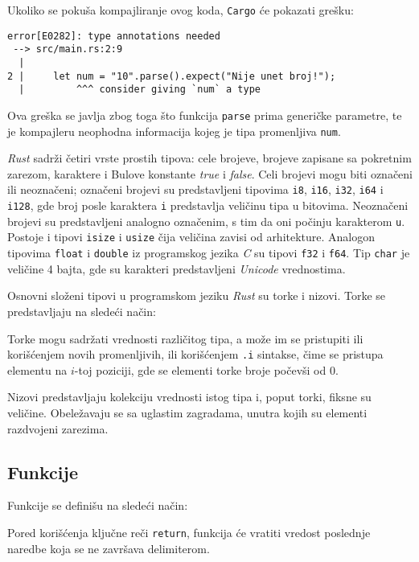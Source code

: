 \documentclass[12pt,oneside]{memoir}
\begin{document}
Ukoliko se pokuša kompajliranje ovog koda, \texttt{Cargo} će
pokazati grešku:

\begin{verbatim}
error[E0282]: type annotations needed
 --> src/main.rs:2:9
  |
2 |     let num = "10".parse().expect("Nije unet broj!");
  |         ^^^ consider giving `num` a type
\end{verbatim}

Ova greška se javlja zbog toga što funkcija \texttt{parse}
prima generičke parametre, te je kompajleru neophodna informacija
kojeg je tipa promenljiva \texttt{num}.

\emph{Rust} sadrži četiri vrste prostih tipova: cele brojeve,
brojeve zapisane sa pokretnim zarezom, karaktere i Bulove
konstante \emph{true} i \emph{false}. Celi brojevi mogu biti
označeni ili neoznačeni; označeni brojevi su predstavljeni
tipovima \texttt{i8}, \texttt{i16}, \texttt{i32}, \texttt{i64} i
\texttt{i128}, gde broj posle karaktera \texttt{i} predstavlja
veličinu tipa u bitovima. Neoznačeni brojevi su predstavljeni
analogno označenim, s tim da oni počinju karakterom \texttt{u}.
Postoje i tipovi \texttt{isize} i \texttt{usize} čija veličina
zavisi od arhitekture.
Analogon tipovima \texttt{float} i \texttt{double} iz programskog
jezika \emph{C} su tipovi \texttt{f32} i \texttt{f64}. Tip
\texttt{char} je veličine 4 bajta, gde su karakteri predstavljeni
\emph{Unicode} vrednostima.

Osnovni složeni tipovi u programskom jeziku \emph{Rust} su torke
i nizovi. Torke se predstavljaju na sledeći način:



Torke mogu sadržati vrednosti različitog tipa, a može im se pristupiti
ili korišćenjem novih promenljivih, ili korišćenjem \texttt{.i} sintakse,
čime se pristupa elementu na $i$-toj poziciji, gde se elementi torke broje
počevši od $0$.

Nizovi predstavljaju kolekciju vrednosti istog tipa i, poput torki,
fiksne su veličine. Obeležavaju se sa uglastim zagradama, unutra kojih su elementi
razdvojeni zarezima.

\subsection{Funkcije}
Funkcije se definišu na sledeći način:



Pored korišćenja ključne reči \texttt{return}, funkcija će vratiti
vredost poslednje naredbe koja se ne završava delimiterom.
\end{document}
